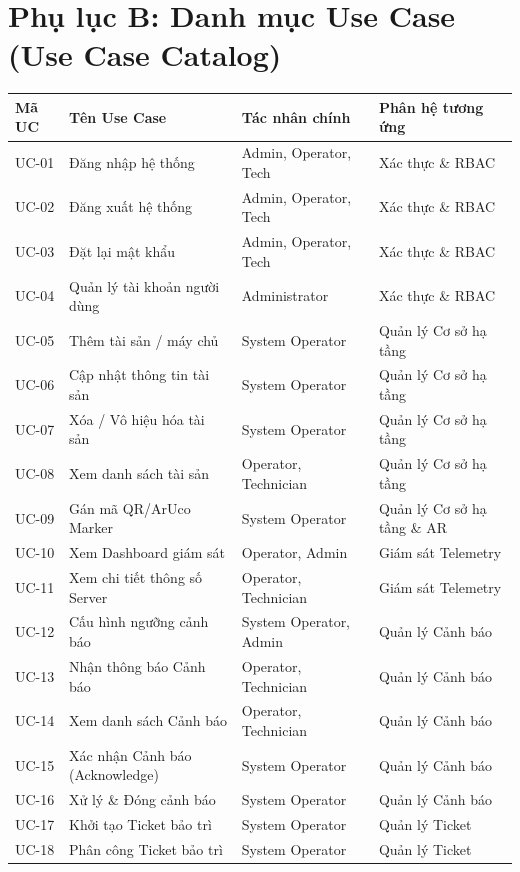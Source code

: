 \section{Phụ lục B: Danh mục Use Case (Use Case Catalog)}
\begin{longtable}{|p{1.5cm}|p{4.5cm}|p{3.5cm}|p{5cm}|}
\hline
\textbf{Mã UC} & \textbf{Tên Use Case} & \textbf{Tác nhân chính} & \textbf{Phân hệ tương ứng} \\ \hline
\endhead
UC-01 & Đăng nhập hệ thống & Admin, Operator, Tech & Xác thực \& RBAC \\ \hline
UC-02 & Đăng xuất hệ thống & Admin, Operator, Tech & Xác thực \& RBAC \\ \hline
UC-03 & Đặt lại mật khẩu & Admin, Operator, Tech & Xác thực \& RBAC \\ \hline
UC-04 & Quản lý tài khoản người dùng & Administrator & Xác thực \& RBAC \\ \hline
UC-05 & Thêm tài sản / máy chủ & System Operator & Quản lý Cơ sở hạ tầng \\ \hline
UC-06 & Cập nhật thông tin tài sản & System Operator & Quản lý Cơ sở hạ tầng \\ \hline
UC-07 & Xóa / Vô hiệu hóa tài sản & System Operator & Quản lý Cơ sở hạ tầng \\ \hline
UC-08 & Xem danh sách tài sản & Operator, Technician & Quản lý Cơ sở hạ tầng \\ \hline
UC-09 & Gán mã QR/ArUco Marker & System Operator & Quản lý Cơ sở hạ tầng \& AR \\ \hline
UC-10 & Xem Dashboard giám sát & Operator, Admin & Giám sát Telemetry \\ \hline
UC-11 & Xem chi tiết thông số Server & Operator, Technician & Giám sát Telemetry \\ \hline
UC-12 & Cấu hình ngưỡng cảnh báo & System Operator, Admin & Quản lý Cảnh báo \\ \hline
UC-13 & Nhận thông báo Cảnh báo & Operator, Technician & Quản lý Cảnh báo \\ \hline
UC-14 & Xem danh sách Cảnh báo & Operator, Technician & Quản lý Cảnh báo \\ \hline
UC-15 & Xác nhận Cảnh báo (Acknowledge) & System Operator & Quản lý Cảnh báo \\ \hline
UC-16 & Xử lý \& Đóng cảnh báo & System Operator & Quản lý Cảnh báo \\ \hline
UC-17 & Khởi tạo Ticket bảo trì & System Operator & Quản lý Ticket \\ \hline
UC-18 & Phân công Ticket bảo trì & System Operator & Quản lý Ticket \\ \hline

\end{longtable}
